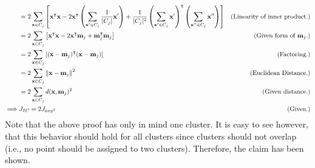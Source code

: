 \begin{solution}
\begin{align*}
        &= 2\sum_{\textbf{x} \in C_j}\left[ \textbf{x}^{\intercal} \textbf{x} - 2 \textbf{x}^{\intercal} \left(\sum_{\textbf{x}' \in C_j}\frac{1}{|C_j|}\textbf{x}'\right) + \frac{1}{|C_j|^2} \left(\sum_{\textbf{x}' \in C_j}\textbf{x}'\right)^{\intercal} \left(\sum_{\textbf{x}'' \in C_j}  \textbf{x}''\right)\right] &\text{(Linearity of inner product.)}\\
        &= 2\sum_{\textbf{x} \in C_j}\left[ \textbf{x}^{\intercal} \textbf{x} - 2 \textbf{x}^{\intercal} \textbf{m}_j + \textbf{m}_j ^{\intercal} \textbf{m}_j\right] &\text{(Given form of $\textbf{m}_j$.)}\\
        &= 2\sum_{\textbf{x} \in C_j}\left[ (\textbf{x} - \textbf{m}_j)^{\intercal} (\textbf{x} - \textbf{m}_j)\right] &\text{(Factoring.)}\\
        &= 2\sum_{\textbf{x} \in C_j} \norm{\textbf{x} - \textbf{m}_j}^2 &\text{(Euclidean Distance.)}\\
        &= 2\sum_{\textbf{x} \in C_j} d(\textbf{x}, \textbf{m}_j)^2 &\text{(Given distance.)}\\
        \implies& J_{IC} = 2J_{avg^2} &\text{(Given.)}
    \end{align*}
    \vspace{-12mm}\alignbreak
    Note that the above proof has only in mind one cluster. It is easy to see however, that this behavior should hold for all clusters since clusters should not overlap (i.e., no point should be assigned to two clusters). Therefore, the claim has been shown. 
\end{solution}

\newpage
